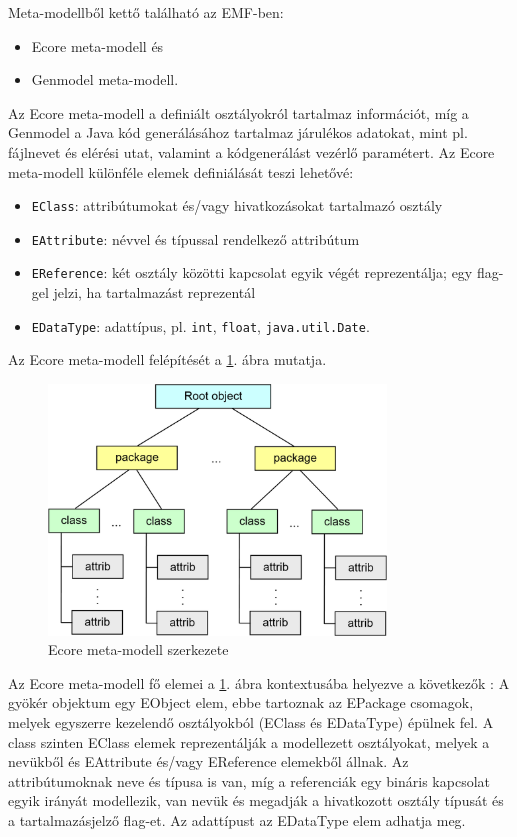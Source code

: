 Meta-modellből kettő található az EMF-ben:
\begin{itemize}
	\item Ecore meta-modell és 
	\item Genmodel meta-modell.
\end{itemize}
Az Ecore meta-modell a definiált osztályokról tartalmaz információt, míg a Genmodel a Java kód generálásához tartalmaz járulékos adatokat, mint pl. fájlnevet és elérési utat, valamint a kódgenerálást vezérlő paramétert.
Az Ecore meta-modell különféle elemek definiálását teszi lehetővé:
\begin{itemize}
	\item \texttt{EClass}: attribútumokat és/vagy hivatkozásokat tartalmazó osztály
	\item \texttt{EAttribute}: névvel és típussal rendelkező attribútum
	\item \texttt{EReference}: két osztály közötti kapcsolat egyik végét reprezentálja; egy flag-gel jelzi, ha tartalmazást reprezentál
	\item \texttt{EDataType}: adattípus, pl. \texttt{int}, \texttt{float}, \texttt{java.util.Date}.
\end{itemize}
%
Az Ecore meta-modell felépítését a \ref{fig:EcoreStruct}. ábra mutatja.
%
\begin{figure}[htb]
\centering
\includegraphics[width=0.8\textwidth]{figures/ecore-metamodel-struct.png}
\caption{Ecore meta-modell szerkezete}
\label{fig:EcoreStruct}
\end{figure}
%
Az Ecore meta-modell fő elemei a \ref{fig:EcoreStruct}. ábra kontextusába helyezve a következők \cite{EMFFundamentals}: 
A gyökér objektum egy EObject elem, ebbe tartoznak az EPackage csomagok, melyek egyszerre kezelendő osztályokból (EClass és EDataType) épülnek fel.
A class szinten EClass elemek reprezentálják a modellezett osztályokat, melyek a nevükből és EAttribute és/vagy EReference elemekből állnak.
Az attribútumoknak neve és típusa is van, míg a referenciák egy bináris kapcsolat egyik irányát modellezik, van nevük és megadják a hivatkozott osztály típusát és a tartalmazásjelző flag-et.
Az adattípust az EDataType elem adhatja meg.  

